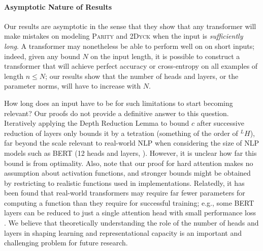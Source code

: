 \documentclass[11pt,a4paper]{article}
\begin{document}
\paragraph{Asymptotic Nature of Results}
Our results are asymptotic in the sense that they show that any transformer will make mistakes on modeling \textsc{Parity} and \textsc{2Dyck} when the input is \emph{sufficiently long}.
A transformer may nonetheless be able to perform well on on short inputs; indeed, given any bound $N$ on the input length, it is possible to construct a transformer that will achieve perfect accuracy or cross-entropy on all examples of length $n \leq N$; our results show that the number of heads and layers, or the parameter norms, will have to increase with $N$.

How long does an input have to be for such limitations to start becoming relevant?
Our proofs do not provide a definitive answer to this question.
Iteratively applying the Depth Reduction Lemma to bound $c$ after successive reduction of layers only bounds it by a tetration (something of the order of $^L H$), far beyond the scale relevant to real-world NLP when considering the size of NLP models such as BERT (12 heads and layers, \citet{devlin2018bert}).
However, it is unclear how far this bound is from optimality.
Also, note that our proof for hard attention makes no assumption about activation functions, and stronger bounds might be obtained by restricting to realistic functions used in implementations.
Relatedly, it has been found that real-world transformers may require far fewer parameters for computing a function than they require for successful training; e.g., some BERT layers can be reduced to just a single attention head with small performance loss \citep{voita2019analyzing,michel2019sixteen}.
We believe that theoretically understanding the role of the number of heads and layers in shaping learning and representational capacity is an important and challenging problem for future research.


\end{document}
